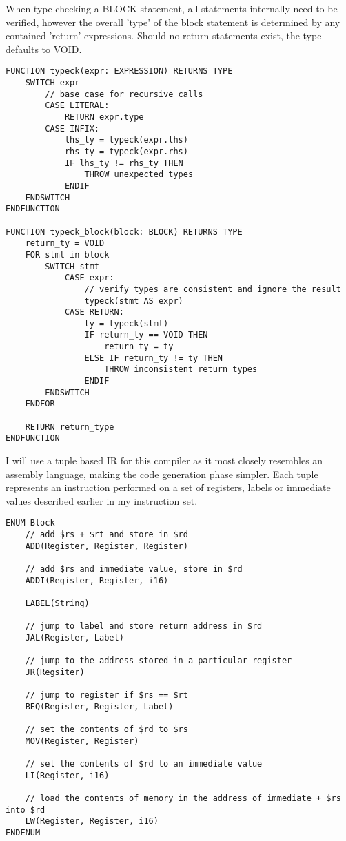 When type checking a BLOCK statement, all statements internally need to be verified, however the overall 'type' of the block statement is determined by any contained 'return' expressions. Should no return statements exist, the type defaults to VOID.

\begin{lstlisting}
FUNCTION typeck(expr: EXPRESSION) RETURNS TYPE
    SWITCH expr 
        // base case for recursive calls
        CASE LITERAL: 
            RETURN expr.type
        CASE INFIX:
            lhs_ty = typeck(expr.lhs)
            rhs_ty = typeck(expr.rhs)
            IF lhs_ty != rhs_ty THEN 
                THROW unexpected types
            ENDIF 
    ENDSWITCH
ENDFUNCTION

FUNCTION typeck_block(block: BLOCK) RETURNS TYPE
    return_ty = VOID
    FOR stmt in block 
        SWITCH stmt 
            CASE expr: 
                // verify types are consistent and ignore the result
                typeck(stmt AS expr)
            CASE RETURN:
                ty = typeck(stmt)
                IF return_ty == VOID THEN
                    return_ty = ty 
                ELSE IF return_ty != ty THEN 
                    THROW inconsistent return types
                ENDIF
        ENDSWITCH
    ENDFOR

    RETURN return_type 
ENDFUNCTION
\end{lstlisting}

I will use a tuple based IR for this compiler as it most closely resembles an assembly language, making the code generation phase simpler. Each tuple represents an instruction performed on a set of registers, labels or immediate values described earlier in my instruction set.

\begin{lstlisting}
ENUM Block
    // add $rs + $rt and store in $rd
    ADD(Register, Register, Register) 

    // add $rs and immediate value, store in $rd
    ADDI(Register, Register, i16)     

    LABEL(String)

    // jump to label and store return address in $rd
    JAL(Register, Label)           

    // jump to the address stored in a particular register 
    JR(Regsiter)                   

    // jump to register if $rs == $rt
    BEQ(Register, Register, Label) 

    // set the contents of $rd to $rs
    MOV(Register, Register)     

    // set the contents of $rd to an immediate value 
    LI(Register, i16)           

    // load the contents of memory in the address of immediate + $rs into $rd
    LW(Register, Register, i16) 
ENDENUM
\end{lstlisting}

